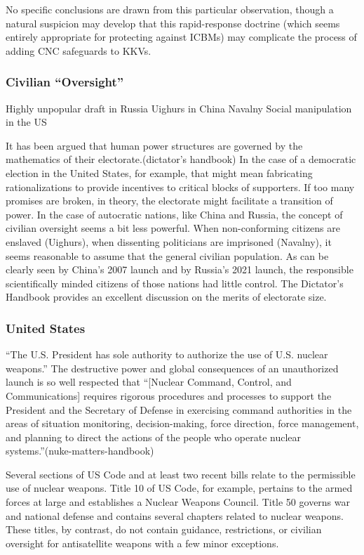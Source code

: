 No specific conclusions are drawn from this particular observation,
though a natural suspicion may develop that this rapid-response
doctrine (which seems entirely appropriate for protecting against
ICBMs) may complicate the process of adding CNC safeguards to KKVs.

\subsubsection{Civilian ``Oversight''}
Highly unpopular draft in Russia
Uighurs in China
Navalny
Social manipulation in the US

It has been argued that human power structures are governed by the
mathematics of their electorate.(dictator's handbook) In the case of a
democratic election in the United States, for example, that might mean
fabricating rationalizations to provide incentives to critical blocks
of supporters.  If too many promises are broken, in theory, the
electorate might facilitate a transition of power.  In the case of
autocratic nations, like China and Russia, the concept of civilian
oversight seems a bit less powerful.  When non-conforming citizens are
enslaved (Uighurs), when dissenting politicians are imprisoned
(Navalny), it seems reasonable to assume that the general civilian
population.  As can be clearly seen by China's 2007 launch and by
Russia's 2021 launch, the responsible scientifically minded citizens
of those nations had little control.  The Dictator's Handbook provides
an excellent discussion on the merits of electorate size.


\subsubsection{United States}
``The U.S. President has sole authority to authorize the use of
U.S. nuclear weapons.''  The destructive power and global consequences
of an unauthorized launch is so well respected that ``[Nuclear
  Command, Control, and Communications] requires rigorous procedures
and processes to support the President and the Secretary of Defense in
exercising command authorities in the areas of situation monitoring,
decision-making, force direction, force management, and planning to
direct the actions of the people who operate nuclear
systems.''(nuke-matters-handbook)

Several sections of US Code and at least two recent bills relate to
the permissible use of nuclear weapons.  Title 10 of US Code, for
example, pertains to the armed forces at large and establishes a
Nuclear Weapons Council.  Title 50 governs war and national defense
and contains several chapters related to nuclear weapons.  These
titles, by contrast, do not contain guidance, restrictions, or
civilian oversight for antisatellite weapons with a few minor
exceptions.

